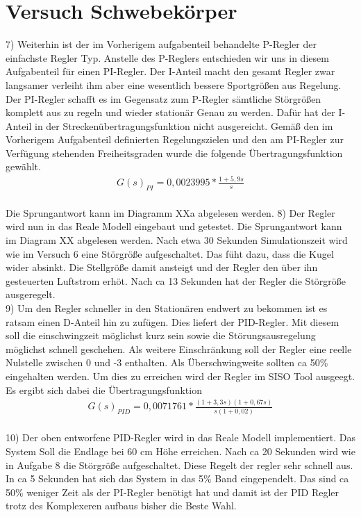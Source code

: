 \documentclass[10pt]{scrartcl}
\begin{document}
\section{Versuch Schwebekörper}

7) Weiterhin ist der im Vorherigem aufgabenteil behandelte P-Regler der einfachste Regler Typ. Anstelle des P-Reglers entschieden wir uns in diesem Aufgabenteil für einen PI-Regler. Der I-Anteil macht den gesamt Regler zwar langsamer verleiht ihm aber eine wesentlich bessere Sportgrößen aus Regelung. Der PI-Regler schafft es im Gegensatz zum P-Regler sämtliche Störgrößen komplett aus zu regeln und wieder stationär Genau zu werden. Dafür hat der I-Anteil in der Streckenübertragungsfunktion nicht ausgereicht. Gemäß den im Vorherigem Aufgabenteil definierten Regelungszielen und den am PI-Regler zur Verfügung stehenden Freiheitsgraden wurde die folgende Übertragungsfunktion gewählt. 
\begin{align}
   G(s)_{PI}=0,0023995*\frac{1+5,9s}{s}
\end{align} \\
Die Sprungantwort kann im Diagramm XXa abgelesen werden.
8) Der Regler wird nun in das Reale Modell eingebaut und getestet. Die Sprungantwort kann im Diagram XX abgelesen werden.
Nach etwa 30 Sekunden Simulationszeit wird wie im Versuch 6 eine Störgröße aufgeschaltet. Das füht dazu, dass die Kugel wider absinkt. Die Stellgröße damit ansteigt und der Regler den über ihn gesteuerten Luftstrom erhöt. Nach ca 13 Sekunden hat der Regler die Störgröße ausgeregelt.\\
9) Um den Regler schneller in den Stationären endwert zu bekommen ist es ratsam einen D-Anteil hin zu zufügen. Dies liefert der PID-Regler.
Mit diesem soll die einschwingzeit möglichst kurz sein sowie die Störungsausregelung möglichst schnell geschehen. Als weitere Einschränkung soll der Regler eine reelle Nulstelle zwischen 0 und -3 enthalten. Als Überschwingweite sollten ca 50\% eingehalten werden.
Um dies zu erreichen wird der Regler im SISO Tool ausgeegt.
Es ergibt sich dabei die Übertragungsfunktion
\begin{align}
   G(s)_{PID}=0,0071761*\frac{(1+3,3s)(1+0,67s)}{s(1+0,02)}
\end{align} \\
10) Der oben entworfene PID-Regler wird in das Reale Modell implementiert.
Das System Soll die Endlage bei 60 cm Höhe erreichen. Nach ca 20 Sekunden wird wie in Aufgabe 8 die Störgröße aufgeschaltet. Diese Regelt der regler sehr schnell aus. In ca 5 Sekunden hat sich das System in das 5\% Band eingependelt. Das sind ca 50\% weniger Zeit als der PI-Regler benötigt hat und damit ist der PID Regler trotz des Komplexeren aufbaus bisher die Beste Wahl.
\end{document}
